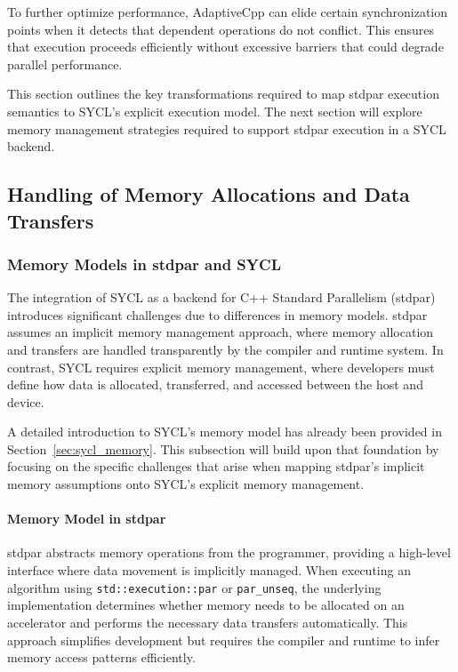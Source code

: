 To further optimize performance, AdaptiveCpp can elide certain synchronization points when it detects that
dependent operations do not conflict. This ensures that execution proceeds efficiently without excessive
barriers that could degrade parallel performance.

This section outlines the key transformations required to map stdpar execution semantics to SYCL’s explicit
execution model. The next section will explore memory management strategies required to support stdpar execution
in a SYCL backend.







\subsection{Handling of Memory Allocations and Data Transfers}
\label{sec:memory_handling}

\subsubsection{Memory Models in stdpar and SYCL}
\label{sec:memory_models}

The integration of SYCL as a backend for C++ Standard Parallelism (stdpar) introduces significant challenges due
to differences in memory models. stdpar assumes an implicit memory management approach, where memory
allocation and transfers are handled transparently by the compiler and runtime system. In contrast, SYCL requires
explicit memory management, where developers must define how data is allocated, transferred, and accessed
between the host and device.

A detailed introduction to SYCL’s memory model has already been provided in Section~\ref{sec:sycl_memory}.
This subsection will build upon that foundation by focusing on the specific challenges that arise when mapping
stdpar’s implicit memory assumptions onto SYCL’s explicit memory management.

\paragraph{Memory Model in stdpar}
stdpar abstracts memory operations from the programmer, providing a high-level interface where data movement
is implicitly managed. When executing an algorithm using \texttt{std::execution::par} or \texttt{par\_unseq},
the underlying implementation determines whether memory needs to be allocated on an accelerator and
performs the necessary data transfers automatically. This approach simplifies development but requires the
compiler and runtime to infer memory access patterns efficiently.

